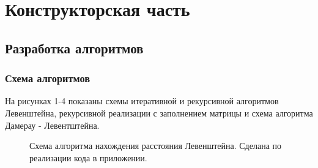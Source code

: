 \documentclass[a4paper]{article}
\begin{document}
	\clearpage
	\section{Конструкторская часть}
	\subsection{Разработка алгоритмов}
	\subsubsection{Схема алгоритмов}
	На рисунках 1-4 показаны схемы  итеративной и рекурсивной алгоритмов Левенштейна, рекурсивной реализации с заполнением матрицы и схема алгоритма Дамерау - Левентштейна.
	\begin{figure}[h]
		\caption{Схема алгоритма нахождения расстояния Левенштейна. Сделана по реализации кода в приложении.\centering}
		\label{image1}
	\end{figure}
\end{document}
